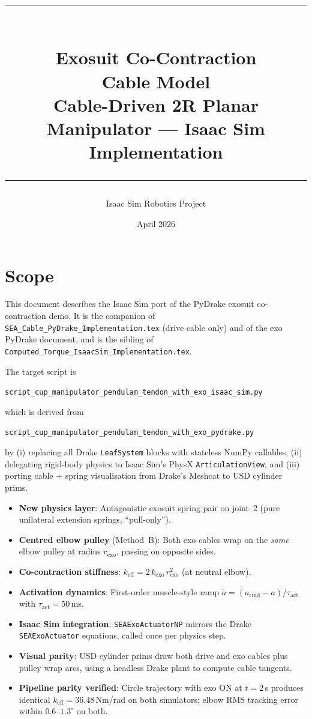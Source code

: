 \documentclass[11pt,a4paper]{article}
\title{%
    \textcolor{isaacgreen}{\rule{\linewidth}{1.5pt}}\\[0.4cm]
    {\Huge\bfseries Exosuit Co-Contraction}\\[0.15cm]
    {\Huge\bfseries Cable Model}\\[0.3cm]
    {\Large\textcolor{drakecyan}{Cable-Driven 2R Planar Manipulator --- Isaac Sim Implementation}}\\[0.2cm]
    \textcolor{isaacgreen}{\rule{\linewidth}{1.5pt}}
}
\author{Isaac Sim Robotics Project}
\date{April 2026}
\newcommand{\rexo}{r_{\mathrm{exo}}}
\newcommand{\kexo}{k_{\mathrm{exo}}}
\newcommand{\keff}{k_{\mathrm{eff}}}
\begin{document}
\maketitle
\thispagestyle{empty}

\section*{Scope}

This document describes the Isaac Sim port of the PyDrake exosuit co-contraction
demo.  It is the companion of \texttt{SEA\_Cable\_PyDrake\_Implementation.tex}
(drive cable only) and of the exo PyDrake document, and is the sibling of
\texttt{Computed\_Torque\_IsaacSim\_Implementation.tex}.

The target script is
\begin{center}
\texttt{script\_cup\_manipulator\_pendulam\_tendon\_with\_exo\_isaac\_sim.py}
\end{center}
which is derived from
\begin{center}
\texttt{script\_cup\_manipulator\_pendulam\_tendon\_with\_exo\_pydrake.py}
\end{center}
by (i) replacing all Drake \texttt{LeafSystem} blocks with stateless NumPy
callables, (ii) delegating rigid-body physics to Isaac Sim's PhysX
\texttt{ArticulationView}, and (iii) porting cable + spring visualisation
from Drake's Meshcat to USD cylinder prims.

\begin{resultbox}
\begin{itemize}[leftmargin=1.5em]
    \item \textbf{New physics layer}: Antagonistic exosuit spring pair on joint~2
          (pure unilateral extension springs, ``pull-only'').
    \item \textbf{Centred elbow pulley} (Method~B): Both exo cables wrap on the
          \emph{same} elbow pulley at radius $\rexo$, passing on opposite sides.
    \item \textbf{Co-contraction stiffness}:
          $\keff = 2\,\kexo\,\rexo^{2}$ (at neutral elbow).
    \item \textbf{Activation dynamics}: First-order muscle-style ramp
          $\dot{a} = (a_{\mathrm{cmd}}-a)/\tau_{\mathrm{act}}$ with
          $\tau_{\mathrm{act}}=50$\,ms.
    \item \textbf{Isaac Sim integration}: \texttt{SEAExoActuatorNP} mirrors
          the Drake \texttt{SEAExoActuator} equations, called once per
          physics step.
    \item \textbf{Visual parity}: USD cylinder prims draw both drive and
          exo cables plus pulley wrap arcs, using a headless Drake plant
          to compute cable tangents.
    \item \textbf{Pipeline parity verified}: Circle trajectory with exo
          ON at $t=2$\,s produces identical $\keff=36.48$\,Nm/rad on both
          simulators; elbow RMS tracking error within
          $0.6$--$1.3^\circ$ on both.
\end{itemize}
\end{resultbox}
\end{document}
